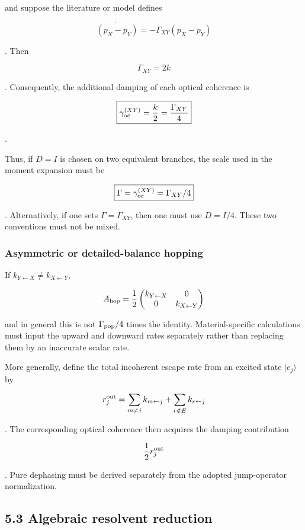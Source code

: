 \documentclass[
  10pt,
  a4paper,
]{article}
\begin{document}
and suppose the literature or model defines

\[
\dot{(p_X-p_Y)}=-\Gamma_{XY}(p_X-p_Y)
\]

. Then

\[
\Gamma_{XY}=2k
\]

. Consequently, the additional damping of each optical coherence is

\[
\boxed{
\gamma_{\rm oc}^{(XY)}
=\frac{k}{2}
=\frac{\Gamma_{XY}}{4}
}
\]

.

Thus, if \(D=I\) is chosen on two equivalent branches, the scale used in
the moment expansion must be

\[
\boxed{
\Gamma=\gamma_{\rm oc}^{(XY)}=\Gamma_{XY}/4
}
\]

. Alternatively, if one sets \(\Gamma=\Gamma_{XY}\), then one must use
\(D=I/4\). These two conventions must not be mixed.

\subsubsection{Asymmetric or detailed-balance
hopping}\label{asymmetric-or-detailed-balance-hopping}

If \(k_{Y\leftarrow X}\neq k_{X\leftarrow Y}\),

\[
A_{\rm hop}
=\frac12
\begin{pmatrix}
k_{Y\leftarrow X}&0\\
0&k_{X\leftarrow Y}
\end{pmatrix}
\]

and in general this is not \(\Gamma_{\rm pop}/4\) times the identity.
Material-specific calculations must input the upward and downward rates
separately rather than replacing them by an inaccurate scalar rate.

More generally, define the total incoherent escape rate from an excited
state \(|e_j\rangle\) by

\[
r_j^{\rm out}=\sum_{m\neq j}k_{m\leftarrow j}
+\sum_{r\notin E}k_{r\leftarrow j}
\]

. The corresponding optical coherence then acquires the damping
contribution

\[
\frac12r_j^{\rm out}
\]

. Pure dephasing must be derived separately from the adopted
jump-operator normalization.

\subsection{5.3 Algebraic resolvent
reduction}\label{algebraic-resolvent-reduction}
\end{document}
